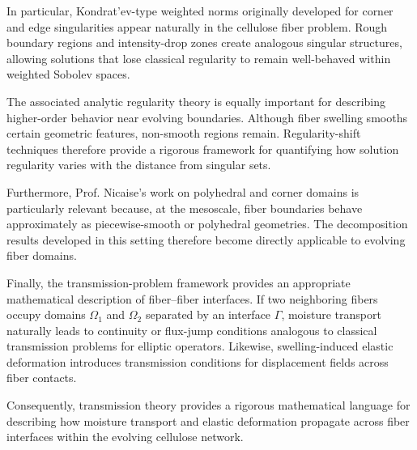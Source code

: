 In particular, Kondrat'ev-type weighted norms originally developed for corner and edge singularities appear naturally in the cellulose fiber problem. Rough boundary regions and intensity-drop zones create analogous singular structures, allowing solutions that lose classical regularity to remain well-behaved within weighted Sobolev spaces.

The associated analytic regularity theory is equally important for describing higher-order behavior near evolving boundaries. Although fiber swelling smooths certain geometric features, non-smooth regions remain. Regularity-shift techniques therefore provide a rigorous framework for quantifying how solution regularity varies with the distance from singular sets.

Furthermore, Prof. Nicaise's work on polyhedral and corner domains is particularly relevant because, at the mesoscale, fiber boundaries behave approximately as piecewise-smooth or polyhedral geometries. The decomposition results developed in this setting therefore become directly applicable to evolving fiber domains.

Finally, the transmission-problem framework provides an appropriate mathematical description of fiber--fiber interfaces. If two neighboring fibers occupy domains $\Omega_1$ and $\Omega_2$ separated by an interface $\Gamma$, moisture transport naturally leads to continuity or flux-jump conditions analogous to classical transmission problems for elliptic operators. Likewise, swelling-induced elastic deformation introduces transmission conditions for displacement fields across fiber contacts.

Consequently, transmission theory provides a rigorous mathematical language for describing how moisture transport and elastic deformation propagate across fiber interfaces within the evolving cellulose network.